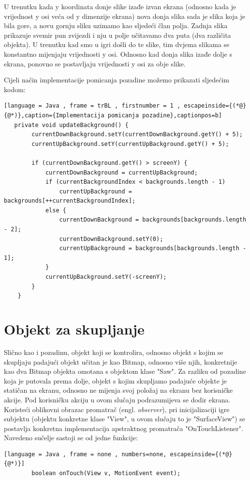\documentclass[times, utf8, zavrsni, numeric]{fer}
\begin{document}
	U trenutku kada y koordinata donje slike izađe izvan ekrana (odnosno kada je vrijednost y osi veća od y dimenzije ekrana) nova donja slika sada je slika koja je bila gore, a novu gornju sliku uzimamo 
	kao sljedeći član polja. 
	Zadnja slika prikazuje svemir pun zvijezdi i nju u polje učitavamo dva puta (dva različita objekta). U trenutku kad smo u igri došli do te slike, tim dvjema slikama se konstantno mijenjaju vrijednosti y osi.
	Odnosno kad donja slika izađe dolje s ekrana, ponovno se postavljaju vrijednosti y osi za obje slike. 
	
	
	Cijeli način implementacije \cite{surfaceview2} pomicanja pozadine možemo prikazati sljedećim kodom:
	\renewcommand{\lstlistingname}{Kôd}
	\begin{lstlisting}[language = Java , frame = trBL , firstnumber = 1 , escapeinside={(*@}{@*)},caption={Implementacija pomicanja pozadine},captionpos=b]
   private void updateBackground() {
        currentDownBackground.setY(currentDownBackground.getY() + 5);
        currentUpBackground.setY(currentUpBackground.getY() + 5);

        if (currentDownBackground.getY() > screenY) {
            currentDownBackground = currentUpBackground;
            if (currentBackgroundIndex < backgrounds.length - 1)     
                currentUpBackground = backgrounds[++currentBackgroundIndex]; 
            else {
                currentDownBackground = backgrounds[backgrounds.length - 2];
                currentDownBackground.setY(0);
                currentUpBackground = backgrounds[backgrounds.length - 1];
            }
            currentUpBackground.setY(-screenY);
        }
    }
	\end{lstlisting}



	\section{Objekt za skupljanje}
	Slično kao i pozadinu, objekt koji se kontrolira, odnosno objekt s kojim se skupljaju padajući objekt učitan je kao  Bitmap, odnosno više njih, konkretnije kao dva Bitmap objekta omotana s objektom
	klase "Saw". Za razliku od pozadine koja je putovala prema dolje, objekt s kojim skupljamo padajuće objekte je statičan na ekranu, odnosno ne mijenja svoj položaj na ekranu bez korisničke akcije. Pod korisničku akciju u 
	ovom slučaju podrazumijeva se dodir ekrana. Koristeći oblikovni obrazac promatrač (engl. \textit{observer}), pri inicijalizaciji igre  subjektu (objektu konkretne klase "View", u ovom slučaju to je "SurfaceView")
	se postavlja konkretna implementacija apstraktnog promatrača "OnTouchListener". Navedeno sučelje sastoji se od jedne funkcije:
	\begin{lstlisting}[language = Java , frame = none , numbers=none, escapeinside={(*@}{@*)}]
		boolean onTouch(View v, MotionEvent event); 
	\end{lstlisting}
	
\end{document}

